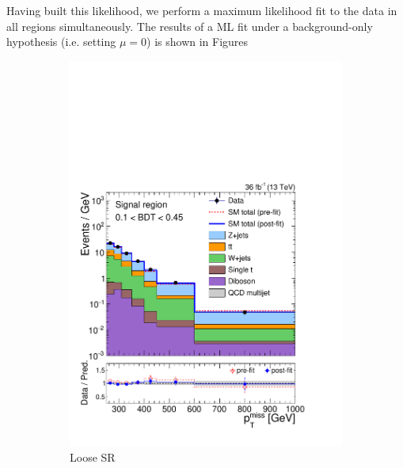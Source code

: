 Having built this likelihood, we perform a maximum likelihood fit to the data in all regions simultaneously.
The results of a ML fit under a background-only hypothesis (i.e. setting $\mu = 0$) is shown in Figures

\begin{figure}[]
    \begin{center}
        \begin{subfigure}[t]{0.49\textwidth}
            \includegraphics[width=\textwidth]{figures/monotop/postfit/stackedPostfit_signal_monotop_loose.pdf}
            \caption{Loose SR}
        \end{subfigure}
        \begin{subfigure}[t]{0.49\textwidth}

\end{subfigure}
\end{center}
\end{figure}
